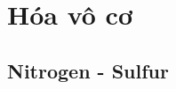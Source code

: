 \documentclass[Main.tex]{subfiles}
\begin{document}
	\part{Hóa vô cơ}
	\chapter{Nitrogen - Sulfur}
	
\end{document}
